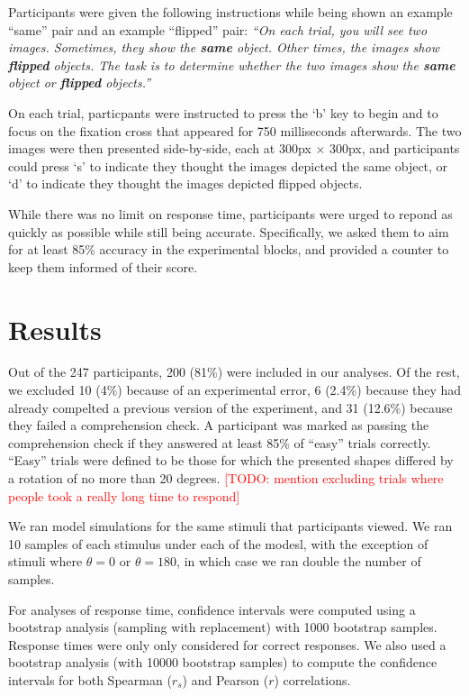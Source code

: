 \documentclass[10pt,letterpaper]{article}
\newcommand{\TODO}[1]{\textcolor{red}{[TODO: #1]}}
\begin{document}
Participants were given the following instructions while being shown
an example ``same'' pair and an example ``flipped'' pair: \textit{``On
  each trial, you will see two images. Sometimes, they show the
  \textbf{same} object. Other times, the images show \textbf{flipped}
  objects. The task is to determine whether the two images show the
  \textbf{same} object or \textbf{flipped} objects.''}

On each trial, particpants were instructed to press the `b' key to
begin and to focus on the fixation cross that appeared for 750
milliseconds afterwards. The two images were then presented
side-by-side, each at 300px $\times$ 300px, and participants could
press `s' to indicate they thought the images depicted the same
object, or `d' to indicate they thought the images depicted flipped
objects.

While there was no limit on response time, participants were urged to
repond as quickly as possible while still being
accurate. Specifically, we asked them to aim for at least 85\%
accuracy in the experimental blocks, and provided a counter to keep
them informed of their score.

\section{Results}

Out of the 247 participants, 200 (81\%) were included in our
analyses. Of the rest, we excluded 10 (4\%) because of an experimental
error, 6 (2.4\%) because they had already compelted a previous version
of the experiment, and 31 (12.6\%) because they failed a comprehension
check. A participant was marked as passing the comprehension check if
they answered at least 85\% of ``easy'' trials correctly. ``Easy''
trials were defined to be those for which the presented shapes
differed by a rotation of no more than 20 degrees. \TODO{mention
  excluding trials where people took a really long time to respond}

We ran model simulations for the same stimuli that participants
viewed. We ran 10 samples of each stimulus under each of the modesl,
with the exception of stimuli where $\theta=0$ or $\theta=180$, in
which case we ran double the number of samples.

For analyses of response time, confidence intervals were computed
using a bootstrap analysis (sampling with replacement) with 1000
bootstrap samples. Response times were only only considered for
correct responses.  We also used a bootstrap analysis (with 10000
bootstrap samples) to compute the confidence intervals for both
Spearman ($r_s$) and Pearson ($r$) correlations.
\end{document}

